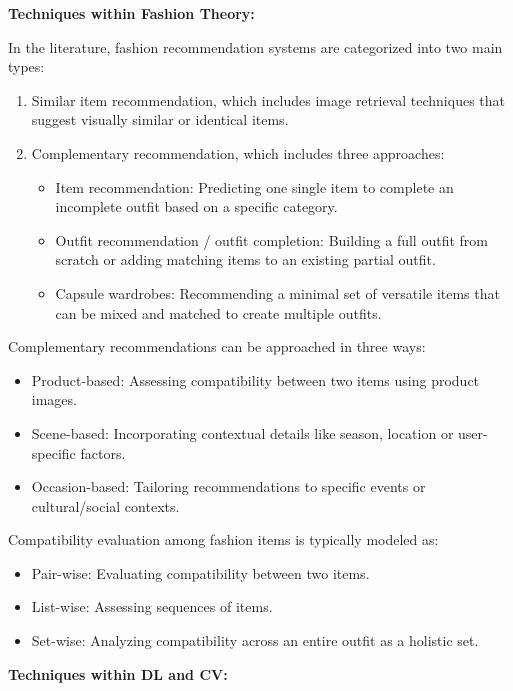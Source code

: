 \vspace{0.5cm}
\textbf{Techniques within Fashion Theory:}
\vspace{0.5cm}

In the literature, fashion recommendation systems are categorized into two main types: \cite[vgl.]{shirkhani_study_2023}
\begin{enumerate}
  \item Similar item recommendation, which includes image retrieval techniques that suggest visually similar or identical items.
  \item Complementary recommendation, which includes three approaches:
  \begin{itemize}
    \item Item recommendation: Predicting one single item to complete an incomplete outfit based on a specific category.
    \item Outfit recommendation / outfit completion: Building a full outfit from scratch or adding matching items to an existing partial outfit.
    \item Capsule wardrobes: Recommending a minimal set of versatile items that can be mixed and matched to create multiple outfits.
  \end{itemize}
\end{enumerate}

Complementary recommendations can be approached in three ways:
\begin{itemize}
  \item Product-based: Assessing compatibility between two items using product images.
  \item Scene-based: Incorporating contextual details like season, location or user-specific factors.
  \item Occasion-based: Tailoring recommendations to specific events or cultural/social contexts.
\end{itemize}

Compatibility evaluation among fashion items is typically modeled as:
\begin{itemize}
  \item Pair-wise: Evaluating compatibility between two items.
  \item List-wise: Assessing sequences of items.
  \item Set-wise: Analyzing compatibility across an entire outfit as a holistic set.
\end{itemize}

\vspace{0.5cm}
\textbf{Techniques within \acs{DL} and \acs{CV}:}
\vspace{0.5cm}

